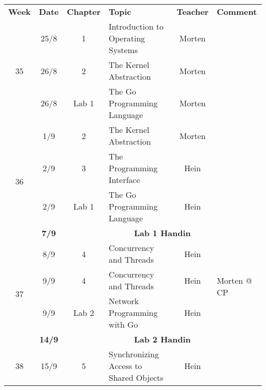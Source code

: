 
\begin{table}[h]
\begin{tabular}{ccclcl}
\textbf{Week}       & \textbf{Date}  & \textbf{Chapter} & \textbf{Topic}                         & \textbf{Teacher} & \textbf{Comment}                \\
\multirow{3}{*}{35} & 25/8           & 1                & Introduction to Operating Systems      & Morten           &                                 \\
                    & 26/8           & 2                & The Kernel Abstraction                 & Morten           &                                 \\
                    & 26/8           & Lab 1            & The Go Programming Language            & Morten           &                                 \\
\multirow{4}{*}{36} & 1/9            & 2                & The Kernel Abstraction                 & Morten           &                                 \\
                    & 2/9            & 3                & The Programming Interface              & Hein             &                                 \\
                    & 2/9            & Lab 1            & The Go Programming Language            & Hein             &                                 \\
                    & \textbf{7/9}   & \multicolumn{4}{c}{\textbf{Lab 1 Handin}}                                                                      \\
\multirow{4}{*}{37} & 8/9            & 4                & Concurrency and Threads                & Hein             & \multirow{3}{*}{Morten @ CP}    \\
                    & 9/9            & 4                & Concurrency and Threads                & Hein             &                                 \\
                    & 9/9            & Lab 2            & Network Programming with Go            & Hein             &                                 \\
                    & \textbf{14/9}  & \multicolumn{4}{c}{\textbf{Lab 2 Handin}}                                                                      \\
\multirow{4}{*}{38} & 15/9           & 5                & Synchronizing Access to Shared Objects & Hein             &                                 \\

\end{tabular}
\end{table}
